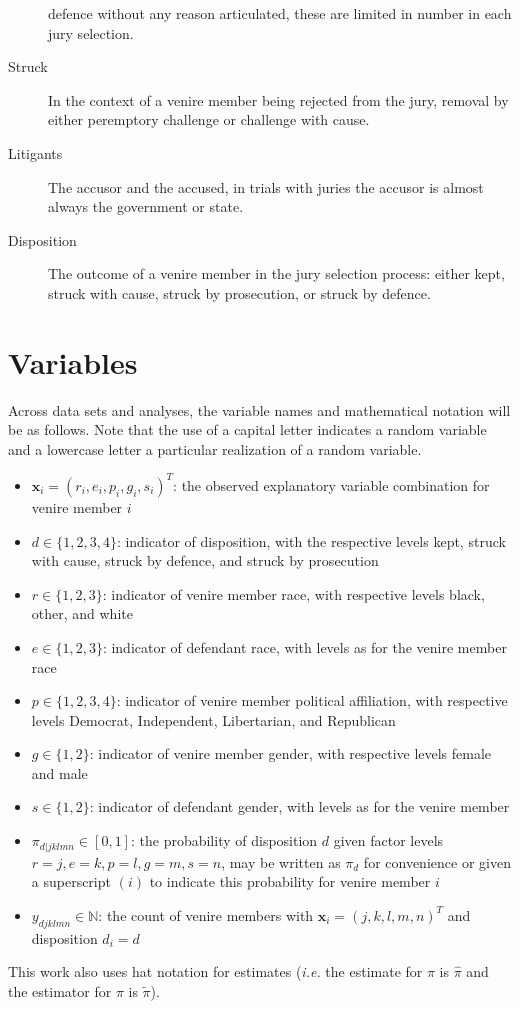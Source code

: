 \begin{description}
  defence without any reason articulated, these are limited in number
  in each jury selection.
\item[Struck] In the context of a venire member being rejected from the jury, removal by either peremptory challenge or challenge
  with cause.
\item[Litigants] The accusor and the accused, in trials with juries the accusor is almost always the government or state.
\item[Disposition] The outcome of a venire member in the jury selection process: either kept, struck with cause, struck by
  prosecution, or struck by defence.
\end{description}

\section*{Variables} \label{not:variables}

Across data sets and analyses, the variable names and mathematical notation will be as follows. Note that the use of a capital
letter indicates a random variable and a lowercase letter a particular realization of a random variable.

\begin{itemize}
\item $\mathbf{x}_i = (r_i,e_i,p_i,g_i,s_i)^T$: the observed explanatory variable combination for venire member $i$
\item $d \in \{1,2,3,4\}$: indicator of disposition, with the respective levels kept, struck with cause, struck by defence,
  and struck by prosecution
\item $r \in \{1,2,3\}$: indicator of venire member race, with respective levels black, other, and white
\item $e \in \{1,2,3\}$: indicator of defendant race, with levels as for the venire member race
\item $p \in \{1,2,3,4\}$: indicator of venire member political affiliation, with respective levels Democrat, Independent,
  Libertarian, and Republican
\item $g \in \{1,2\}$: indicator of venire member gender, with respective levels female and male
\item $s \in \{1,2\}$: indicator of defendant gender, with levels as for the venire member
\item $\pi_{d|jklmn} \in [0,1]$: the probability of disposition $d$ given factor levels $r = j, e = k, p = l, g = m, s = n$, may
  be written as $\pi_d$ for convenience or given a superscript $(i)$ to indicate this probability for venire member $i$
\item $y_{djklmn} \in \mathbb{N}$: the count of venire members with
  $\textbf{x}_i = (j,k,l,m,n)^T$ and disposition $d_i = d$
\end{itemize}

This work also uses hat notation for estimates (\textit{i.e.} the estimate for $\pi$ is $\hat{\pi}$ and the estimator for $\pi$ is
$\tilde{\pi}$).

